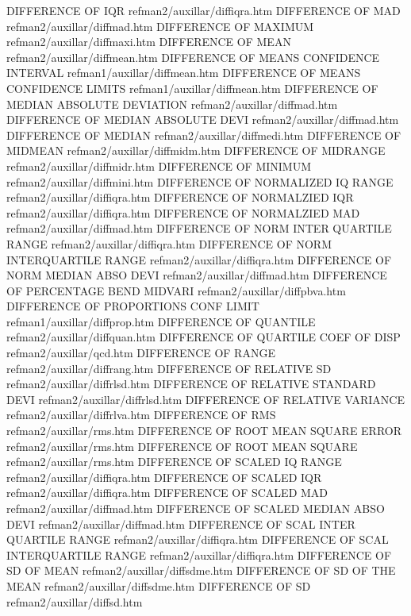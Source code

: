 DIFFERENCE OF IQR                       refman2/auxillar/diffiqra.htm
DIFFERENCE OF MAD                       refman2/auxillar/diffmad.htm
DIFFERENCE OF MAXIMUM                   refman2/auxillar/diffmaxi.htm
DIFFERENCE OF MEAN                      refman2/auxillar/diffmean.htm
DIFFERENCE OF MEANS CONFIDENCE INTERVAL refman1/auxillar/diffmean.htm
DIFFERENCE OF MEANS CONFIDENCE LIMITS   refman1/auxillar/diffmean.htm
DIFFERENCE OF MEDIAN ABSOLUTE DEVIATION refman2/auxillar/diffmad.htm
DIFFERENCE OF MEDIAN ABSOLUTE DEVI      refman2/auxillar/diffmad.htm
DIFFERENCE OF MEDIAN                    refman2/auxillar/diffmedi.htm
DIFFERENCE OF MIDMEAN                   refman2/auxillar/diffmidm.htm
DIFFERENCE OF MIDRANGE                  refman2/auxillar/diffmidr.htm
DIFFERENCE OF MINIMUM                   refman2/auxillar/diffmini.htm
DIFFERENCE OF NORMALIZED IQ RANGE       refman2/auxillar/diffiqra.htm
DIFFERENCE OF NORMALZIED IQR            refman2/auxillar/diffiqra.htm
DIFFERENCE OF NORMALZIED MAD            refman2/auxillar/diffmad.htm
DIFFERENCE OF NORM INTER QUARTILE RANGE refman2/auxillar/diffiqra.htm
DIFFERENCE OF NORM INTERQUARTILE RANGE  refman2/auxillar/diffiqra.htm
DIFFERENCE OF NORM MEDIAN ABSO DEVI     refman2/auxillar/diffmad.htm
DIFFERENCE OF PERCENTAGE BEND MIDVARI   refman2/auxillar/diffpbva.htm
DIFFERENCE OF PROPORTIONS CONF LIMIT    refman1/auxillar/diffprop.htm
DIFFERENCE OF QUANTILE                  refman2/auxillar/diffquan.htm
DIFFERENCE OF QUARTILE COEF OF DISP     refman2/auxillar/qcd.htm
DIFFERENCE OF RANGE                     refman2/auxillar/diffrang.htm
DIFFERENCE OF RELATIVE SD               refman2/auxillar/diffrlsd.htm
DIFFERENCE OF RELATIVE STANDARD DEVI    refman2/auxillar/diffrlsd.htm
DIFFERENCE OF RELATIVE VARIANCE         refman2/auxillar/diffrlva.htm
DIFFERENCE OF RMS                       refman2/auxillar/rms.htm
DIFFERENCE OF ROOT MEAN SQUARE ERROR    refman2/auxillar/rms.htm
DIFFERENCE OF ROOT MEAN SQUARE          refman2/auxillar/rms.htm
DIFFERENCE OF SCALED IQ RANGE           refman2/auxillar/diffiqra.htm
DIFFERENCE OF SCALED IQR                refman2/auxillar/diffiqra.htm
DIFFERENCE OF SCALED MAD                refman2/auxillar/diffmad.htm
DIFFERENCE OF SCALED MEDIAN ABSO DEVI   refman2/auxillar/diffmad.htm
DIFFERENCE OF SCAL INTER QUARTILE RANGE refman2/auxillar/diffiqra.htm
DIFFERENCE OF SCAL INTERQUARTILE RANGE  refman2/auxillar/diffiqra.htm
DIFFERENCE OF SD OF MEAN                refman2/auxillar/diffsdme.htm
DIFFERENCE OF SD OF THE MEAN            refman2/auxillar/diffsdme.htm
DIFFERENCE OF SD                        refman2/auxillar/diffsd.htm
